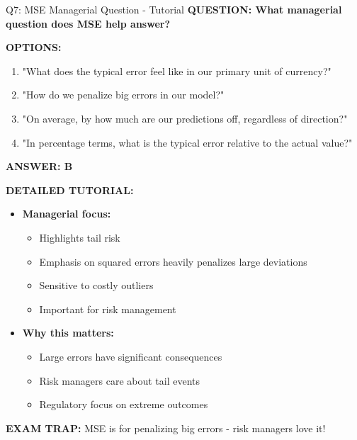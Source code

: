 \documentclass[8pt]{beamer}
\begin{document}
	\begin{frame}{Q7: MSE Managerial Question - Tutorial}
		\fontsize{6.5}{7.5}\selectfont
		\textbf{QUESTION: What managerial question does MSE help answer?}
		
		\vspace{0.1cm}
		\textbf{OPTIONS:}
		\begin{enumerate}
			\item "What does the typical error feel like in our primary unit of currency?"
			\item "How do we penalize big errors in our model?"
			\item "On average, by how much are our predictions off, regardless of direction?"
			\item "In percentage terms, what is the typical error relative to the actual value?"
		\end{enumerate}
		
		\vspace{0.1cm}
		\textcolor{myblue}{\textbf{ANSWER: B}}
		
		\vspace{0.1cm}
		\textbf{DETAILED TUTORIAL:}
		\begin{itemize}
			\item \textbf{Managerial focus:}
			\begin{itemize}
				\item Highlights tail risk
				\item Emphasis on squared errors heavily penalizes large deviations
				\item Sensitive to costly outliers
				\item Important for risk management
			\end{itemize}
			\item \textbf{Why this matters:}
			\begin{itemize}
				\item Large errors have significant consequences
				\item Risk managers care about tail events
				\item Regulatory focus on extreme outcomes
			\end{itemize}
		\end{itemize}
		
		\textcolor{myred}{\textbf{EXAM TRAP:}} MSE is for \textcolor{myblue}{penalizing big errors} - risk managers love it!
	\end{frame}
	
\end{document}
